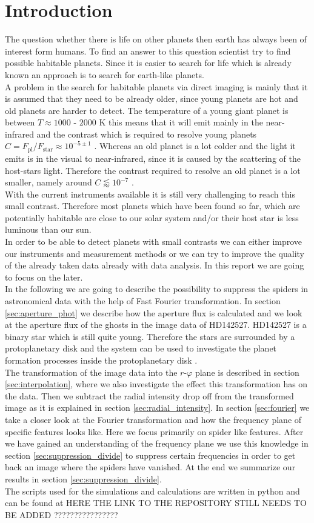 \section{Introduction}
The question whether there is life on other planets then earth has always been of interest form humans. To find an answer to this question scientist try to find possible habitable planets. Since it is easier to search for life which is already known an approach is to search for earth-like planets.\\
A problem in the search for habitable planets via direct imaging is mainly that it is assumed that they need to be already older, since young planets are hot and old planets are harder to detect. The temperature of a young giant planet is between $T \approx 1000$ - $2000$ K this means that it will emit mainly in the near-infrared and the contrast which is required to resolve young planets $C = F_{\mathrm{pl}}/F_{\mathrm{star}} \approx 10^{-5 \pm 1}$ \cite{Hunziker2020}. Whereas an old planet is a lot colder and the light it emits is in the visual to near-infrared, since it is caused by the scattering of the host-stars light. Therefore the contrast required to resolve an old planet is a lot smaller, namely around $C \lessapprox 10^{-7}$ \cite{Hunziker2020}.\\
With the current instruments available it is still very challenging to reach this small contrast. Therefore most planets which have been found so far, which are potentially habitable are close to our solar system and/or their host star is less luminous than our sun.\\
In order to be able to detect planets with small contrasts we can either improve our instruments and measurement methods or we can try to improve the quality of the already taken data already with data analysis. In this report we are going to focus on the later. \\
In the following we are going to describe the possibility to suppress the spiders in astronomical data with the help of Fast Fourier transformation. In section \ref{sec:aperture_phot} we describe how the aperture flux is calculated and we look at the aperture flux of the ghosts in the image data of HD142527. HD142527 is a binary star which is still quite young. Therefore the stars are surrounded by a protoplanetary disk and the system can be used to investigate the planet formation processes inside the protoplanetary disk \cite{HD142527}.\\
The transformation of the image data into the $r$-$\varphi$ plane is described in section \ref{sec:interpolation}, where we also investigate the effect this transformation has on the data. Then we subtract the radial intensity drop off from the transformed image as it is explained in section \ref{sec:radial_intensity}. In section \ref{sec:fourier} we take a closer look at the Fourier transformation and how the frequency plane of specific features looks like. Here we focus primarily on spider like features. After we have gained an understanding of the frequency plane we use this knowledge in section \ref{sec:suppression_divide} to suppress certain frequencies in order to get back an image where the spiders have vanished. At the end we summarize our results in section \ref{sec:suppression_divide}.\\
The scripts used for the simulations and calculations are written in python and can be found 
at HERE THE LINK TO THE REPOSITORY STILL NEEDS TO BE ADDED ????????????????
